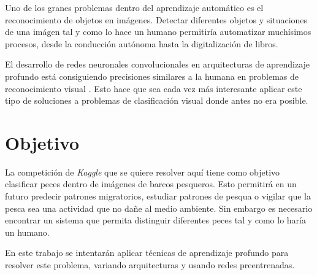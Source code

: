 Uno de los granes problemas dentro del aprendizaje automático es
el reconocimiento de objetos en imágenes. Detectar diferentes 
objetos y situaciones de una imágen tal y como lo hace un humano
permitiría automatizar muchísimos procesos, desde la conducción
autónoma hasta la digitalización de libros.

El desarrollo de redes neuronales convolucionales en arquitecturas de
aprendizaje profundo está consiguiendo precisiones similares a la humana en
problemas de reconocimiento visual \parencite{taigman}. Esto hace que sea cada
vez más interesante aplicar este tipo de soluciones a problemas de
clasificación visual donde antes no era posible.

\section{Objetivo}

La competición de \textit{Kaggle} que se quiere resolver aquí tiene como
objetivo clasificar peces dentro de imágenes de barcos pesqueros. Esto
permitirá en un futuro predecir patrones migratorios, estudiar patrones de
pesqua o vigilar que la pesca sea una actividad que no dañe al medio ambiente.
Sin embargo es necesario encontrar un sistema que permita distinguir diferentes
peces tal y como lo haría un humano.

En este trabajo se intentarán aplicar técnicas de aprendizaje profundo para
resolver este problema, variando arquitecturas y usando redes preentrenadas. 

